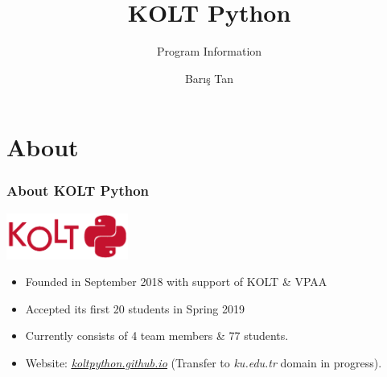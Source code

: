 

\usepackage{../KU-Beamer-Template/style/koc} 

\title{KOLT Python} 
\subtitle{Program Information} 
\date{}
\author{Barış Tan}




  \maketitle


  \section{About}

    \begin{frame}
      \frametitle{About KOLT Python}
      \pause
      \begin{center}
        \includegraphics[width=0.3\textwidth]{images/kolt_python_logo.png}
      \end{center}
      \Large
      \begin{itemize}
        \item Founded in September 2018 with support of KOLT \& VPAA
        \pause
        \item Accepted its first 20 students in Spring 2019
        \pause
        \item Currently consists of 4 team members \& 77 students.
        \pause
        \item Website: \href{https://koltpython.github.io}{\underline{\textit{koltpython.github.io}}} (Transfer to \textit{ku.edu.tr} domain in progress).
      \end{itemize}

    \end{frame}


